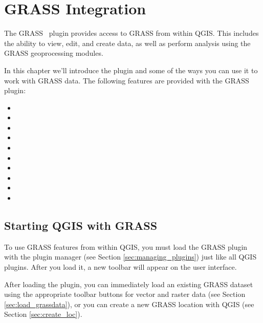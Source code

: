 \section{GRASS Integration}\label{sec:grass}

The GRASS~\cite{GRASSweb} plugin provides access to GRASS from within QGIS. 
This includes the ability to view, edit, and create data, as well as perform 
analysis using the GRASS geoprocessing modules.

In this chapter we'll introduce the plugin and some of the ways you can use 
it to work with GRASS data. The following features are provided with the GRASS 
plugin:
 
\begin{itemize}
\item {}
\item {}
\item {}
\item {} 
\item {}
\item {}
\item {}
\item {}
\item {}
\item {}
\end{itemize}

\subsection{Starting QGIS with GRASS}\label{sec:starting_grass}

To use GRASS features from within QGIS, you must load the 
GRASS plugin with the plugin manager (see Section \ref{sec:managing_plugins}) just 
like all QGIS plugins. After you load it, a new toolbar will appear on the user 
interface.

After loading the plugin, you can immediately load an existing GRASS dataset 
using the appropriate toolbar buttons for vector and raster data (see Section 
\ref{sec:load_grassdata}), or you can create a new GRASS location with QGIS (see Section 
\ref{sec:create_loc}).


